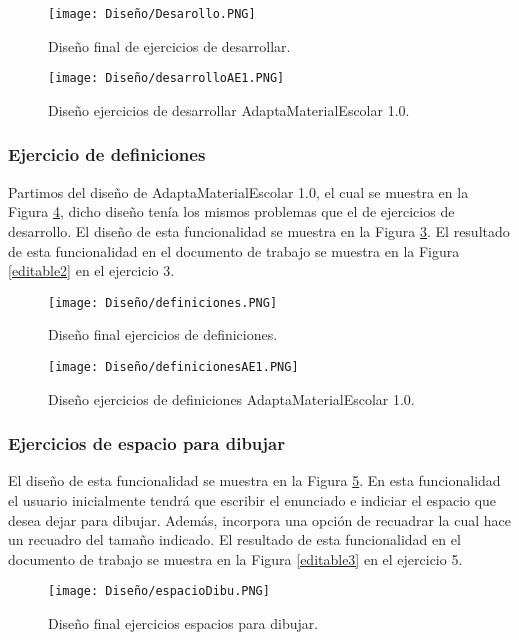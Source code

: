  \begin{figure}[ht!]
  \centering
  \texttt{[image: Diseño/Desarollo.PNG]}
  \caption{Diseño final de ejercicios de desarrollar.}
  \label{Desarrollo}
\end{figure}

\begin{figure}[ht!]
  \centering
  \texttt{[image: Diseño/desarrolloAE1.PNG]}
  \caption{Diseño ejercicios de desarrollar AdaptaMaterialEscolar 1.0.}
  \label{desAE1}
\end{figure}

 \subsubsection{Ejercicio de definiciones}
 Partimos del diseño de AdaptaMaterialEscolar 1.0, el cual se muestra en la Figura \ref{defiAE1}, dicho diseño tenía los mismos problemas que el de ejercicios de desarrollo. El diseño de esta funcionalidad se muestra en la Figura \ref{defi}. El resultado de esta funcionalidad en el documento de trabajo se muestra en la Figura \ref{editable2} en el ejercicio 3.

 \begin{figure}[ht!]
  \centering
  \texttt{[image: Diseño/definiciones.PNG]}
  \caption{Diseño final ejercicios de definiciones.}
  \label{defi}
\end{figure}

\begin{figure}[ht!]
  \centering
  \texttt{[image: Diseño/definicionesAE1.PNG]}
  \caption{Diseño ejercicios de definiciones AdaptaMaterialEscolar 1.0.}
  \label{defiAE1}
\end{figure}

 \subsubsection{Ejercicios de espacio para dibujar}
 El diseño de esta funcionalidad se muestra en la Figura \ref{espaciosDibu}. En esta funcionalidad el usuario inicialmente tendrá que escribir el enunciado e indiciar el espacio que desea dejar para dibujar. Además, incorpora una opción de recuadrar la cual hace un recuadro del tamaño indicado. El resultado de esta funcionalidad en el documento de trabajo se muestra en la Figura \ref{editable3} en el ejercicio 5. 

 \begin{figure}[ht!]
  \centering
  \texttt{[image: Diseño/espacioDibu.PNG]}
  \caption{Diseño final ejercicios espacios para dibujar.}
  \label{espaciosDibu}
\end{figure}

